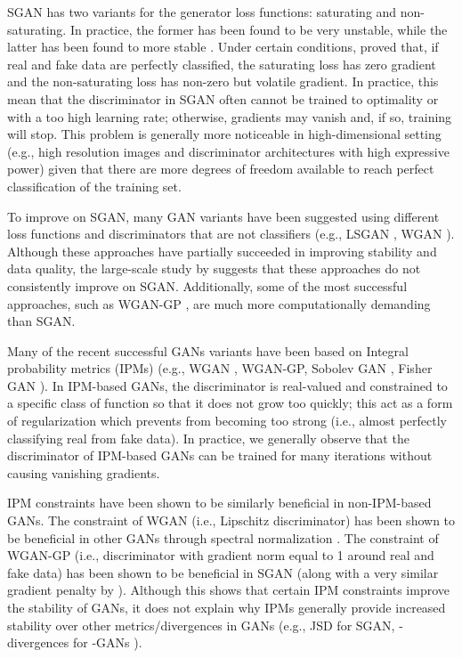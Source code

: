 \documentclass{article}
\begin{document}
SGAN has two variants for the generator loss functions: saturating and non-saturating. In practice, the former has been found to be very unstable, while the latter has been found to more stable \citep{GAN}. Under certain conditions, \citet{GANTheorems} proved that, if real and fake data are perfectly classified, the saturating loss has zero gradient and the non-saturating loss has non-zero but volatile gradient. In practice, this mean that the discriminator in SGAN often cannot be trained to optimality or with a too high learning rate; otherwise, gradients may vanish and, if so, training will stop. This problem is generally more noticeable in high-dimensional setting (e.g., high resolution images and discriminator architectures with high expressive power) given that there are more degrees of freedom available to reach perfect classification of the training set.

To improve on SGAN, many GAN variants have been suggested using different loss functions and discriminators that are not classifiers (e.g., LSGAN \citep{LSGAN}, WGAN \citep{WGAN}). Although these approaches have partially succeeded in improving stability and data quality, the large-scale study by \citet{lucic2017gans} suggests that these approaches do not consistently improve on SGAN. Additionally, some of the most successful approaches, such as WGAN-GP \citep{WGAN-GP}, are much more computationally demanding than SGAN.

Many of the recent successful GANs variants have been based on Integral probability metrics (IPMs) \citep{muller1997integral} (e.g., WGAN \citep{WGAN}, WGAN-GP\citep{WGAN-GP}, Sobolev GAN \citep{mroueh2017sobolev}, Fisher GAN \citep{Fisher}). In IPM-based GANs, the discriminator is real-valued and constrained to a specific class of function so that it does not grow too quickly; this act as a form of regularization which prevents  from becoming too strong (i.e., almost perfectly classifying real from fake data). In practice, we generally observe that the discriminator of IPM-based GANs can be trained for many iterations without causing vanishing gradients. 
 
IPM constraints have been shown to be similarly beneficial in non-IPM-based GANs. The constraint of WGAN (i.e., Lipschitz discriminator) has been shown to be beneficial in other GANs through spectral normalization \citep{miyato2018spectral}. The constraint of WGAN-GP (i.e., discriminator with gradient norm equal to 1 around real and fake data) has been shown to be beneficial in SGAN \citep{ManyPaths} (along with a very similar gradient penalty by \cite{DRAGAN}). Although this shows that certain IPM constraints improve the stability of GANs, it does not explain why IPMs generally provide increased stability over other metrics/divergences in GANs (e.g., JSD for SGAN, -divergences for -GANs \citep{F-GAN}).
\end{document}
